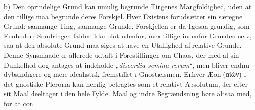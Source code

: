 \documentclass[12pt]{book}
\newcommand{\opage}[1]{\marginnote{\footnotesize\textit{[#1]}}}
\begin{document}
b) Den oprindelige Grund kan umulig begrunde Tingenes Mangfoldighed, uden at den
tillige maa begrunde deres Forskjel. Hver Existens forudsætter sin særegne Grund:
saamange Ting, saamange Grunde. Forskjellen er da ligesaa grundig, som Eenheden;
Sondringen falder ikke blot udenfor, men tillige indenfor Grunden selv, saa at den
absolute Grund maa siges at have en Utallighed af relative Grunde. Denne Synsmaade er
allerede udtalt i Forestillingen om Chaos, der med al sin Dunkelhed dog antages at
indeholde „\textit{discordia semina rerum}“, men bliver endnu dybsindigere og mere
idealistisk fremstillet i Gnosticismen. Enhver Æon (αἰὼν) i det gnostiske Pleroma kan
nemlig betragtes som et relativt Absolutum, der efter sit Maal deeltager i den hele
Fylde. Maal og indre Begrændsning høre altsaa med, for at con%
\opage{129}%
%
%
\end{document}
